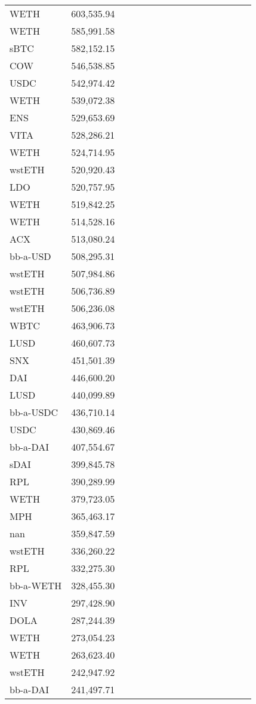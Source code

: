 \begin{longtable}{@{}p{0.25\linewidth}p{0.25\linewidth}p{0.25\linewidth}p{0.25\linewidth}@{}}
WETH & 603,535.94 & & \\
WETH & 585,991.58 & & \\
sBTC & 582,152.15 & & \\
COW & 546,538.85 & & \\
USDC & 542,974.42 & & \\
WETH & 539,072.38 & & \\
ENS & 529,653.69 & & \\
VITA & 528,286.21 & & \\
WETH & 524,714.95 & & \\
wstETH & 520,920.43 & & \\
LDO & 520,757.95 & & \\
WETH & 519,842.25 & & \\
WETH & 514,528.16 & & \\
ACX & 513,080.24 & & \\
bb-a-USD & 508,295.31 & & \\
wstETH & 507,984.86 & & \\
wstETH & 506,736.89 & & \\
wstETH & 506,236.08 & & \\
WBTC & 463,906.73 & & \\
LUSD & 460,607.73 & & \\
SNX & 451,501.39 & & \\
DAI & 446,600.20 & & \\
LUSD & 440,099.89 & & \\
bb-a-USDC & 436,710.14 & & \\
USDC & 430,869.46 & & \\
bb-a-DAI & 407,554.67 & & \\
sDAI & 399,845.78 & & \\
RPL & 390,289.99 & & \\
WETH & 379,723.05 & & \\
MPH & 365,463.17 & & \\
nan & 359,847.59 & & \\
wstETH & 336,260.22 & & \\
RPL & 332,275.30 & & \\
bb-a-WETH & 328,455.30 & & \\
INV & 297,428.90 & & \\
DOLA & 287,244.39 & & \\
WETH & 273,054.23 & & \\
WETH & 263,623.40 & & \\
wstETH & 242,947.92 & & \\
bb-a-DAI & 241,497.71 & & \\

\end{longtable}

